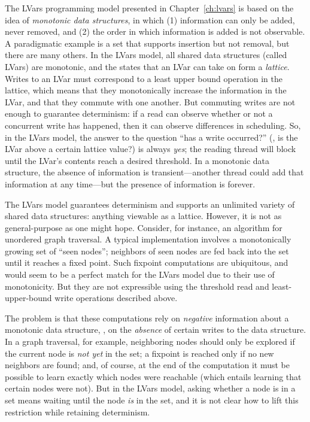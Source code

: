 The LVars programming model presented in Chapter~\ref{ch:lvars} is
based on the idea of \emph{monotonic data structures}, in which (1)
information can only be added, never removed, and (2) the order in
which information is added is not observable.  A paradigmatic example
is a set that supports insertion but not removal, but there are many
others.  In the LVars model, all shared data structures (called LVars)
are monotonic, and the states that an LVar can take on form a
\emph{lattice}.  Writes to an LVar must correspond to a least upper
bound operation in the lattice, which means that they monotonically
increase the information in the LVar, and that they commute with one
another.  But commuting writes are not enough to guarantee
determinism: if a read can observe whether or not a concurrent write
has happened, then it can observe differences in scheduling.  So, in
the LVars model, the answer to the question ``has a write occurred?''
(\ie, is the LVar above a certain lattice value?)  is always
\emph{yes}; the reading thread will block until the LVar's contents
reach a desired threshold.  In a monotonic data structure, the absence
of information is transient---another thread could add that
information at any time---but the presence of information is forever.

The LVars model guarantees determinism and supports an unlimited
variety of shared data structures: anything viewable as a lattice.
However, it is not as general-purpose as one might hope.  Consider,
for instance, an algorithm for unordered graph traversal.  A typical
implementation involves a monotonically growing set of ``seen nodes'';
neighbors of seen nodes are fed back into the set until it reaches a
fixed point.  Such fixpoint computations are ubiquitous, and would
seem to be a perfect match for the LVars model due to their use of
monotonicity.  But they are not expressible using the threshold read
and least-upper-bound write operations described above.

The problem is that these computations rely on \emph{negative}
information about a monotonic data structure, \ie, on the
\emph{absence} of certain writes to the data structure.  In a graph
traversal, for example, neighboring nodes should only be explored if
the current node is \emph{not yet} in the set; a fixpoint is reached
only if no new neighbors are found; and, of course, at the end of the
computation it must be possible to learn exactly which nodes were
reachable (which entails learning that certain nodes were not).  But
in the LVars model, asking whether a node is in a set means waiting
until the node \emph{is} in the set, and it is not clear how to lift
this restriction while retaining determinism.

